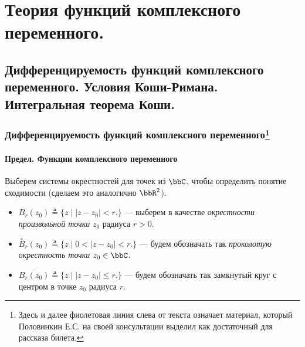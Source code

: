 \part[Теория функций комплексного переменного.]{Теория функций комплексного переменного.}%

\chapter[Дифференцируемость функций комплексного переменного. Условия Коши-Римана. Интегральная теорема Коши.]{Дифференцируемость функций комплексного переменного. Условия Коши-Римана. Интегральная теорема Коши.}

\section[Дифференцируемость функций комплексного переменного]{Дифференцируемость функций комплексного переменного\footnote{Здесь и далее фиолетовая линия слева от текста означает материал, который Половинкин Е.С. на своей консультации выделил как достаточный для рассказа билета.}}

\subsection{Предел. Функции комплексного переменного}
Выберем системы окрестностей для точек из $\bbC$, чтобы определить понятие сходимости (сделаем это аналогично $\bbR^2$).
\begin{itemize}
\item
$B_r(z_0) \triangleq \{z \;\bigl|\; |z-z_0|<r \bigl.\}$ --- выберем в качестве \textit{окрестности произвольной точки} $z_0$ радиуса $r>0.$
\item
$\overset{\circ} {B}_r(z_0)\triangleq \{z \;\bigl|\; 0<|z-z_0|<r \bigl.\}$ --- будем обозначать так \textit{проколотую окрестность точки} $z_0 \in \bbC$.
\item
$\overline{B_r(z_0)} \triangleq \{z \;\bigl|\; |z-z_0|\le r \bigl.\}$ --- будем обозначать так замкнутый круг с центром в точке $z_0$ радиуса $r$. %
\end{itemize}

